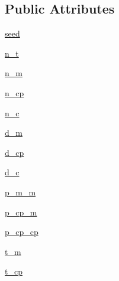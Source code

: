 \subsection*{Public Attributes}
\begin{DoxyCompactItemize}
\item 
\hyperlink{classnetworkx_1_1generators_1_1internet__as__graphs_1_1AS__graph__generator_a615d9aa5b960bd8c17a2241471ca6c00}{seed}
\item 
\hyperlink{classnetworkx_1_1generators_1_1internet__as__graphs_1_1AS__graph__generator_a8a10982d6a7286160a6046136cc8138b}{n\+\_\+t}
\item 
\hyperlink{classnetworkx_1_1generators_1_1internet__as__graphs_1_1AS__graph__generator_ab209ba2ef81df7d492fa1ec1783ee821}{n\+\_\+m}
\item 
\hyperlink{classnetworkx_1_1generators_1_1internet__as__graphs_1_1AS__graph__generator_af082c188bfa6046b5dd9ecdae5bc067d}{n\+\_\+cp}
\item 
\hyperlink{classnetworkx_1_1generators_1_1internet__as__graphs_1_1AS__graph__generator_a348315a7c3340923b4d4c633e4f4051c}{n\+\_\+c}
\item 
\hyperlink{classnetworkx_1_1generators_1_1internet__as__graphs_1_1AS__graph__generator_a2b2a7927c5f0c2c6d61a69b15cb656fe}{d\+\_\+m}
\item 
\hyperlink{classnetworkx_1_1generators_1_1internet__as__graphs_1_1AS__graph__generator_a6c89dbdb4f176bb1b6e37089532dc1b5}{d\+\_\+cp}
\item 
\hyperlink{classnetworkx_1_1generators_1_1internet__as__graphs_1_1AS__graph__generator_a59876110a0ced18bc36ec6c89fe98037}{d\+\_\+c}
\item 
\hyperlink{classnetworkx_1_1generators_1_1internet__as__graphs_1_1AS__graph__generator_aef6437df37f8e5974aa87c2d5c798778}{p\+\_\+m\+\_\+m}
\item 
\hyperlink{classnetworkx_1_1generators_1_1internet__as__graphs_1_1AS__graph__generator_a4516a3858538fa2f9e76c6453052750f}{p\+\_\+cp\+\_\+m}
\item 
\hyperlink{classnetworkx_1_1generators_1_1internet__as__graphs_1_1AS__graph__generator_a8459de5a53d1beb429cfce272c1c23c9}{p\+\_\+cp\+\_\+cp}
\item 
\hyperlink{classnetworkx_1_1generators_1_1internet__as__graphs_1_1AS__graph__generator_a3e15248d5eefc2e55403ce599b31857e}{t\+\_\+m}
\item 
\hyperlink{classnetworkx_1_1generators_1_1internet__as__graphs_1_1AS__graph__generator_a9592a0d6e063108f5b9fbe55b79387bb}{t\+\_\+cp}

\end{DoxyCompactItemize}
